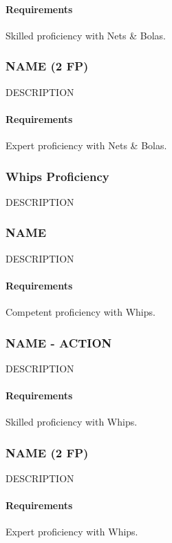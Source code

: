     \paragraph{Requirements} Skilled proficiency with Nets \& Bolas.
\subsubsection{NAME (2 FP)} \label{feat::name}
    DESCRIPTION
    \paragraph{Requirements} Expert proficiency with Nets \& Bolas.
\subsubsection{Whips Proficiency} \label{feat::name}
    DESCRIPTION
\subsubsection{NAME} \label{feat::name}
    DESCRIPTION
    \paragraph{Requirements} Competent proficiency with Whips.
\subsubsection{NAME - ACTION} \label{feat::name}
    DESCRIPTION
    \paragraph{Requirements} Skilled proficiency with Whips.
\subsubsection{NAME (2 FP)} \label{feat::name}
    DESCRIPTION
    \paragraph{Requirements} Expert proficiency with Whips.


